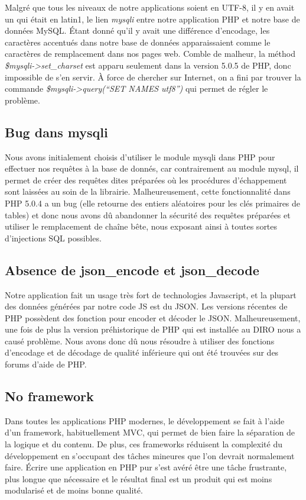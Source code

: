 \documentclass[10pt]{article}
\begin{document}
Malgré que tous les niveaux de notre applications soient en UTF-8, il
y en avait un qui était en latin1, le lien {\em mysqli} entre notre
application PHP et notre base de données MySQL. Étant donné qu'il y
avait une différence d'encodage, les caractères accentués dans notre
base de données apparaissaient comme le caractères de remplacement
dans nos pages web. Comble de malheur, la méthod {\em
  \$mysqli->set\_charset} est apparu seulement dans la version 5.0.5
de PHP, donc impossible de s'en servir. À force de chercher sur
Internet, on a fini par trouver la commande {\em \$mysqli->query(``SET
  NAMES utf8'')} qui permet de régler le problème.

\subsection{Bug dans mysqli}

Nous avons initialement choisis d'utiliser le module mysqli dans PHP
pour effectuer nos requêtes à la base de donnés, car contrairement au
module mysql, il permet de créer des requêtes dites préparées où les
procédures d'échappement sont laissées au soin de la librairie.
Malheureusement, cette fonctionnalité dans PHP 5.0.4 a un bug (elle
retourne des entiers aléatoires pour les clés primaires de tables) et
donc nous avons dû abandonner la sécurité des requêtes préparées et
utiliser le remplacement de chaîne bête, nous exposant ainsi à toutes
sortes d'injections SQL possibles.

\subsection{Absence de json\_encode et json\_decode}

Notre application fait un usage très fort de technologies Javascript,
et la plupart des données générées par notre code JS est du JSON. Les
versions récentes de PHP possèdent des fonction pour encoder et
décoder le JSON. Malheureusement, une fois de plus la version
préhistorique de PHP qui est installée au DIRO nous a causé problème.
Nous avons donc dû nous résoudre à utiliser des fonctions d'encodage
et de décodage de qualité inférieure qui ont été trouvées sur des
forums d'aide de PHP.

\subsection{No framework}

Dans toutes les applications PHP modernes, le développement se fait à
l'aide d'un framework, habituellement MVC, qui permet de bien faire la
séparation de la logique et du contenu.  De plus, ces frameworks
réduisent la complexité du développement en s'occupant des tâches
mineures que l'on devrait normalement faire.  Écrire une application
en PHP pur s'est avéré être une tâche frustrante, plus longue que
nécessaire et le résultat final est un produit qui est moins
modularisé et de moins bonne qualité.
\end{document}
